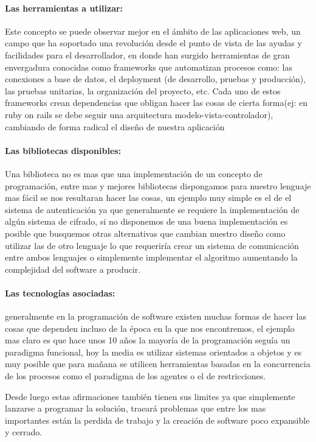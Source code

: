 \paragraph{Las herramientas a utilizar:}
Este concepto se puede observar mejor en el ámbito de las aplicaciones web, un campo que ha soportado una revolución desde el punto de vista de las ayudas y facilidades para el desarrollador, en donde han surgido herramientas de gran envergadura conocidas como frameworks que automatizan procesos como: las conexiones a base de datos, el deployment (de desarrollo, pruebas y producción), las pruebas unitarias, la organización del proyecto, etc. Cada uno de estos frameworks crean dependencias que obligan hacer las cosas de cierta forma(ej: en ruby on rails se debe seguir una arquitectura modelo-vista-controlador), cambiando de forma radical el diseño de nuestra aplicación

\paragraph{Las bibliotecas disponibles:}
Una biblioteca no es mas que una implementación de un concepto de programación, entre mas y mejores bibliotecas dispongamos para nuestro lenguaje mas fácil se nos resultaran hacer las cosas, un ejemplo muy simple es el de el sistema de autenticación ya que generalmente se requiere la implementación de algún sistema de cifrado, si no disponemos de una buena implementación es posible que busquemos otras alternativas que cambian nuestro diseño como utilizar las de otro lenguaje lo que requeriría crear un sistema de comunicación entre ambos lenguajes o simplemente implementar el algoritmo aumentando la complejidad del software a producir.

\paragraph{Las tecnologías asociadas:}
generalmente en la programación de software existen muchas formas de hacer las cosas que dependen incluso de la época en la que nos encontremos, el ejemplo mas claro es que hace unos 10 años la mayoría de la programación seguía un paradigma funcional, hoy la media es utilizar sistemas orientados a objetos y es muy posible que para mañana se utilicen herramientas basadas en la concurrencia de los procesos como el paradigma de los agentes o el de restricciones.


Desde luego estas afirmaciones también tienen sus limites ya que simplemente lanzarse a programar la solución, traeará problemas que entre los mas importantes están la perdida de trabajo y la creación de software poco expansible y cerrado.

